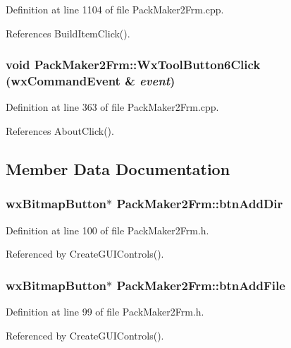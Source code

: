 Definition at line 1104 of file Pack\-Maker2Frm.cpp.

References Build\-Item\-Click().
\subsubsection{\setlength{\rightskip}{0pt plus 5cm}void Pack\-Maker2Frm::Wx\-Tool\-Button6Click (wx\-Command\-Event \& {\em event})}\label{class_pack_maker2_frm_a60b3bc1fc37409ee920cd439f88f664}




Definition at line 363 of file Pack\-Maker2Frm.cpp.

References About\-Click().

\subsection{Member Data Documentation}
\subsubsection{\setlength{\rightskip}{0pt plus 5cm}wx\-Bitmap\-Button$\ast$ {\bf Pack\-Maker2Frm::btn\-Add\-Dir}\hspace{0.3cm}{\tt  [private]}}\label{class_pack_maker2_frm_38d9b0ca0188d7a4aea53b2f99360aaa}




Definition at line 100 of file Pack\-Maker2Frm.h.

Referenced by Create\-GUIControls().
\subsubsection{\setlength{\rightskip}{0pt plus 5cm}wx\-Bitmap\-Button$\ast$ {\bf Pack\-Maker2Frm::btn\-Add\-File}\hspace{0.3cm}{\tt  [private]}}\label{class_pack_maker2_frm_2e9eee89538eca8c7933d759c88fb020}




Definition at line 99 of file Pack\-Maker2Frm.h.

Referenced by Create\-GUIControls().
